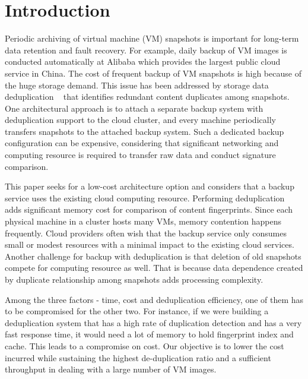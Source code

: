 \section{Introduction}



Periodic  archiving of virtual machine (VM) snapshots is important 
for long-term data  retention and fault recovery. 
For example, daily backup of VM images  is conducted automatically 
at Alibaba which provides the largest public cloud service in China.
The cost of frequent backup of VM snapshots is  high because of the huge storage demand.
This issue has been addressed by   storage data deduplication ~\cite{venti02,bottleneck08} that
identifies redundant content duplicates among snapshots.  
One architectural approach is to attach  a separate backup system with deduplication
support to the cloud cluster, and  every machine periodically transfers snapshots to
the attached backup system.  Such a dedicated backup  configuration can be expensive, 
considering that significant networking  and computing resource  is required to transfer 
raw data and conduct signature comparison. 


This paper seeks for a low-cost architecture option and considers that
a backup service uses the existing cloud computing resource.
Performing deduplication adds significant  memory cost for comparison of content fingerprints. 
Since each physical machine in a cluster  hosts many VMs, memory contention happens frequently. 
Cloud providers often wish that the backup service only consumes  small or modest resources 
with a minimal impact to the existing cloud services.  Another challenge for backup with deduplication is 
that deletion of old snapshots compete for computing resource as well. That is because data dependence created 
by duplicate relationship among snapshots  adds processing complexity.

Among the three factors - time, cost and deduplication efficiency, one of them has to be compromised for the other two. For instance, if we were building a deduplication system that has a high rate of duplication detection and has a very fast response time, 
it would need a lot of memory to hold fingerprint index and cache.  This leads to a compromise on cost. 
Our objective is to lower the cost incurred while sustaining the highest de-duplication ratio
and  a sufficient throughput in dealing with a large number of VM images. 

